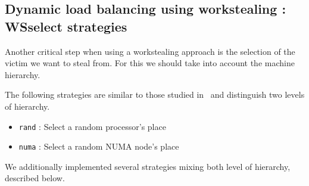 \documentclass{Styles/llncs}
\begin{document}
\subsection{Dynamic load balancing using workstealing : WSselect strategies}

Another critical step when using a workstealing approach is the selection of
the victim we want to steal from.
For this we should take into account the machine hierarchy.

The following strategies are similar to those studied in~\cite{DBLP:journals/ijhpca/OlivierPWSP12}
and distinguish two levels of hierarchy.

\begin{itemize}
  \item \verb/rand/ : Select a random processor's place
  \item \verb/numa/ : Select a random NUMA node's place
\end{itemize}

We additionally implemented several strategies mixing both level of hierarchy,
described below.
\end{document}
